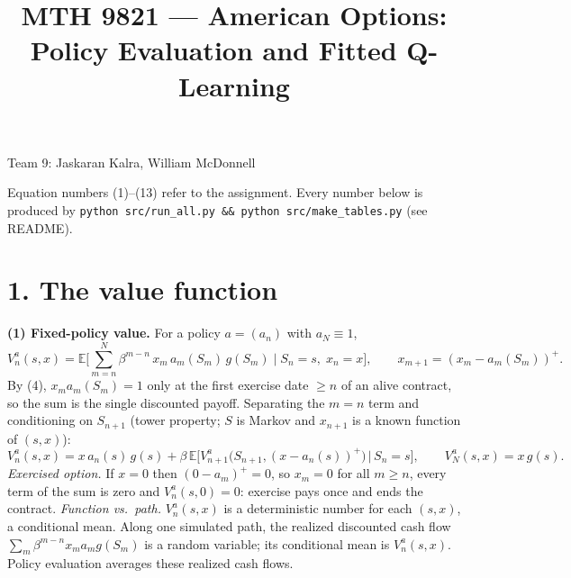 \documentclass[10pt]{article}
\title{MTH 9821 --- American Options: Policy Evaluation and Fitted Q-Learning}
\author{}
\date{}
\newcommand{\E}{\mathbb{E}}
\begin{document}
\maketitle
\vspace{-1.4cm}
\begin{center}
Team 9: Jaskaran Kalra, William McDonnell
\end{center}

Equation numbers (1)--(13) refer to the assignment. Every number below is produced by
\texttt{python src/run\_all.py \&\& python src/make\_tables.py} (see README).

\section*{1. The value function}

\textbf{(1) Fixed-policy value.} For a policy $a=(a_n)$ with $a_N\equiv1$,
\[
V^a_n(s,x)=\E\Big[\sum_{m=n}^{N}\beta^{m-n}\,x_m\,a_m(S_m)\,g(S_m)\;\Big|\;S_n=s,\;x_n=x\Big],
\qquad x_{m+1}=(x_m-a_m(S_m))^+ .
\]
By (4), $x_m a_m(S_m)=1$ only at the first exercise date $\ge n$ of an alive contract, so the sum is
the single discounted payoff. Separating the $m=n$ term and conditioning on $S_{n+1}$ (tower
property; $S$ is Markov and $x_{n+1}$ is a known function of $(s,x)$):
\[
V^a_n(s,x)=x\,a_n(s)\,g(s)+\beta\,\E\big[V^a_{n+1}\big(S_{n+1},(x-a_n(s))^+\big)\,\big|\,S_n=s\big],
\qquad V^a_N(s,x)=x\,g(s).
\]
\emph{Exercised option.} If $x=0$ then $(0-a_m)^+=0$, so $x_m=0$ for all $m\ge n$, every term of
the sum is zero and $V^a_n(s,0)=0$: exercise pays once and ends the contract.
\emph{Function vs.\ path.} $V^a_n(s,x)$ is a deterministic number for each $(s,x)$, a conditional
mean. Along one simulated path, the realized discounted cash flow
$\sum_m\beta^{m-n}x_m a_m g(S_m)$ is a random variable; its conditional mean is $V^a_n(s,x)$.
Policy evaluation averages these realized cash flows.
\end{document}
